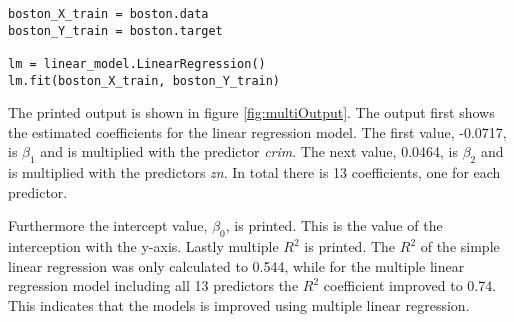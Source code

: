 \begin{lstlisting}[caption={Linear Regression of multiple predictors}, label=lst:mul_lin_reg, mathescape=true]
boston_X_train = boston.data
boston_Y_train = boston.target

lm = linear_model.LinearRegression()
lm.fit(boston_X_train, boston_Y_train)
\end{lstlisting}



The printed output is shown in figure \ref{fig:multiOutput}. The output first shows the estimated coefficients for the linear regression model. The first value, -0.0717, is $\beta_1$ and is multiplied with the predictor \emph{crim}. The next value, 0.0464, is $\beta_2$ and is multiplied with the predictors \emph{zn}. In total there is 13 coefficients, one for each predictor.

Furthermore the intercept value, $\beta_0$, is printed. This is the value of the interception with the y-axis. Lastly multiple $R^2$ is printed. The $R^2$ of the simple linear regression was only calculated to 0.544, while for the multiple linear regression model including all 13 predictors the $R^2$ coefficient improved to 0.74. This indicates that the models is improved using multiple linear regression.



